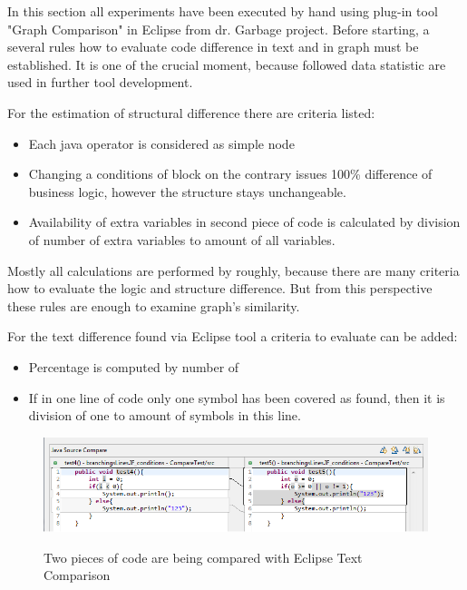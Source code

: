 \documentclass{report}
\begin{document}
In this section all experiments have been executed by hand using plug-in tool "Graph Comparison" in Eclipse from dr. Garbage project. Before starting, a several rules how to evaluate code difference in text and in graph must be established. It is one of the crucial moment, because followed data statistic are used in further tool development.

For the estimation of structural difference there are criteria listed:
\begin{itemize}
	\item Each java operator is considered as simple node
	\item Changing a conditions of block on the contrary issues 100\% difference of business logic, however the structure stays unchangeable.
	\item Availability of extra variables in second piece of code is calculated by division of number of extra variables to amount of all variables.
\end{itemize}

Mostly all calculations are performed by roughly, because there are many criteria how to evaluate the logic and structure difference. But from this perspective these rules are enough to examine graph's similarity.

For the text difference found via Eclipse tool a criteria to evaluate can be added:
\begin{itemize}
	\item Percentage is computed by number of 
	\item If in one line of code only one symbol has been covered as found, then it is division of one to amount of symbols in this line. 
\end{itemize}

\begin{figure}
  \centering
  \includegraphics[width=1.00\textwidth]{Figures/Java-flowchart-exp/example-graph.png}\\[0.1cm]
  \caption[Two pieces of code are being compared with Eclipse Text Comparison]{Two pieces of code are being compared with Eclipse Text Comparison}
  \label{fig:example-graph}
\end{figure}
\end{document}
